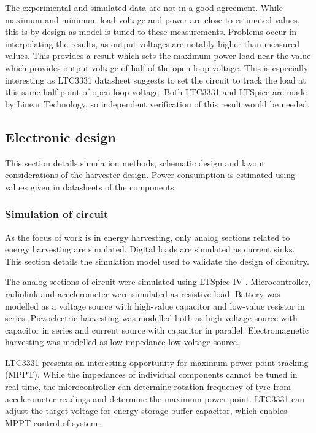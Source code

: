 The experimental and simulated data are not in a good agreement. While maximum and minimum load voltage and power are close to estimated values, this is by design as model is tuned to these measurements. Problems occur in interpolating the results, as output voltages are notably higher than measured values. This provides a result which sets the maximum power load near the value which provides output voltage of half of the open loop voltage. This is especially interesting as LTC3331 datasheet \cite{LTC3331} suggests to set the circuit to track the load at this same half-point of open loop voltage. Both LTC3331 and LTSpice are made by Linear Technology, so independent verification of this result would be needed. 

\subsection{Electronic design} \label{sect:electronic_design}
This section details simulation methods, schematic design and layout considerations of the harvester design. Power consumption is estimated using values given in datasheets of the components. 

\subsubsection{Simulation of circuit}
As the focus of work is in energy harvesting, only analog sections related to energy harvesting are simulated. Digital loads are simulated as current sinks. This section details the simulation model used to validate the design of circuitry.

The analog sections of circuit were simulated using LTSpice IV \cite{ltspice}. Microcontroller, radiolink and accelerometer were simulated as resistive load. Battery was modelled as a voltage source with high-value capacitor and low-value resistor in series. Piezoelectric harvesting was modelled both as high-voltage source with capacitor in series and current source with capacitor in parallel. Electromagnetic harvesting was modelled as low-impedance low-voltage source. 

LTC3331 presents an interesting opportunity for maximum power point tracking (MPPT). While the impedances of individual components cannot be tuned in real-time, the microcontroller can determine rotation frequency of tyre from accelerometer readings and determine the maximum power point. LTC3331 can adjust the target voltage for energy storage buffer capacitor, which enables MPPT-control of system.

